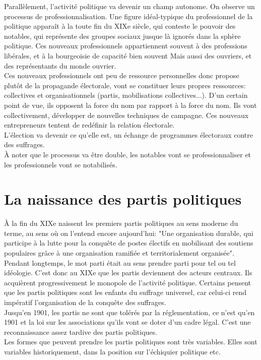 \documentclass[10pt, a4paper, openany]{book}
\begin{document}
Parallèlement, l'activité politique va devenir un champ autonome. On observe un processus de professionnalisation. Une figure idéal-typique du professionnel de la politique apparaît à la toute fin du XIXe siècle, qui conteste le pouvoir des notables, qui représente des groupes sociaux jusque là ignorés dans la sphère politique. Ces nouveaux professionnels appartiennent souvent à des professions libérales, et à la bourgeoisie de capacité bien souvent Mais aussi des ouvriers, et des représentants du monde ouvrier. \\
Ces nouveaux professionnels ont peu de ressource personnelles donc propose plutôt de la propagande électorale, vont se constituer leurs propres ressources: collectives et organisationnels (partis, mobilisations collectives...). D'un certain point de vue, ils opposent la force du nom par rapport à la force du nom. Ils vont collectivement, développer de nouvelles techniques de campagne. Ces nouveaux entrepreneurs tentent de redéfinir la relation électorale.\\
L'élection va devenir ce qu'elle est, un échange de programmes électoraux contre des suffrages. \\
À noter que le processus va être double, les notables vont se professionnaliser et les professionnels vont se notabilisés. 

\section{La naissance des partis politiques}

À la fin du XIXe naissent les premiers partis politiques au sens moderne du terme, au sens où on l'entend encore aujourd'hui: "Une organisation durable, qui participe à la lutte pour la conquête de postes électifs en mobilisant des soutiens populaires grâce à une organisation ramifiée et territorialement organisée". \\
Pendant longtemps, le mot parti était au sens prendre parti pour tel ou tel idéologie. C'est donc au XIXe que les partis deviennent des acteurs centraux. Ils acquièrent progressivement le monopole de l'activité politique. Certains pensent que les partis politiques sont les enfants du suffrage universel, car celui-ci rend impératif l'organisation de la conquête des suffrages. \\
Jusqu'en 1901, les partis ne sont que tolérés par la réglementation, ce n'est qu'en 1901 et la loi sur les associations qu'ils vont se doter d'un cadre légal. C'est une reconnaissance assez tardive des partis politiques. \\
Les formes que peuvent prendre les partis politiques sont très variables. Elles sont variables historiquement, dans la position sur l'échiquier politique etc.
\end{document}
